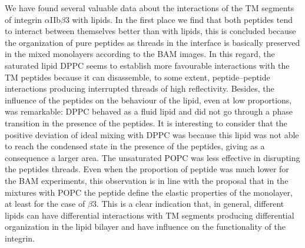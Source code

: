 \documentclass[journal=jacsat,manuscript=article]{achemso}
\begin{document}
We have found several valuable data about the interactions of the TM segments of integrin $\alpha$IIb$\beta$3 with lipids. In the first place we find that both peptides tend to interact between themselves better than with lipids, this is concluded because the organization of pure peptides as threads in the interface is basically preserved in the mixed monolayers according to the BAM images. In this regard, the saturated lipid DPPC seems to establish more favourable interactions with the TM peptides because it can disassemble, to some extent, peptide–peptide interactions producing interrupted threads of high reflectivity. Besides, the influence of the peptides on the behaviour of the lipid, even at low proportions, was remarkable: DPPC behaved as a fluid lipid and did not go through a phase transition in the presence of the peptides. It is interesting to consider that the positive deviation of ideal mixing with DPPC was because this lipid was not able to reach the condensed state in the presence of the peptides, giving as a consequence a larger area. The unsaturated POPC was less effective in disrupting the peptides threads. Even when the proportion of peptide was much lower for the BAM experiments, this observation is in line with the proposal that in the mixtures with POPC the peptide define the elastic properties of the monolayer, at least for the case of $\beta$3. This is a clear indication that, in general, different lipids can have differential interactions with TM segments producing differential organization in the lipid bilayer and have influence on the functionality of the integrin.
\end{document}

